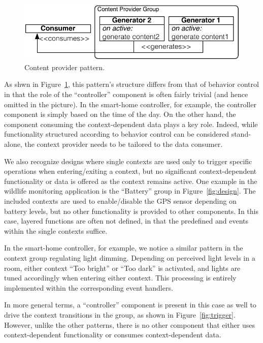 \begin{figure}
\begin{center}
\includegraphics[scale=.5]{imgs/content_provider}
\vspace{-1mm}
\caption{Content provider pattern.}
  \label{fig:provider}
\vspace{-8mm}
\end{center}
\end{figure}

As shwn in Figure~\ref{fig:provider}, this pattern's structure differs
from that of behavior control in that the role of the ``controller''
component is often fairly trivial (and hence omitted in the
picture). In the smart-home controller, for example, the controller
component is simply based on the time of the day. On the other hand,
the component consuming the context-dependent data plays a key
role. Indeed, while functionality structured according to behavior
control can be considered stand-alone, the context provider needs to
be tailored to the data consumer.

 We also recognize designs where single contexts are
used only to trigger specific operations when entering/exiting a
context, but no significant context-dependent functionality or data is
offered as the context remains active. One example in the wildlife
monitoring application is the ``Battery'' group in
Figure~\ref{fig:design}. The included contexts are used to
enable/disable the GPS sensor depending on battery levels, but no
other functionality is provided to other components. In this
case, layered functions are often not defined, in
that the predefined  and  events
within the single contexts suffice.

In the smart-home controller, for example, we notice a similar pattern
in the context group regulating light dimming. Depending on
perceived light levels in a room, either context ``Too bright'' or
``Too dark'' is activated, and lights are tuned accordingly when
entering either context. This processing is entirely implemented
within the corresponding  event handlers. 

In more general terms, a ``controller'' component is present in this
case as well to drive the context transitions in the group, as shown
in Figure~\ref{fig:trigger}. However, unlike the other patterns, there
is no other component that either uses context-dependent functionality
or consumes context-dependent data.

